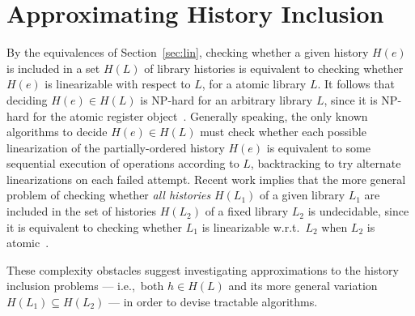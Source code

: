 \section{Approximating History Inclusion}
\label{sec:counting}

By the equivalences of Section~\ref{sec:lin}, checking whether a given history
$H(e)$ is included in a set $H(L)$ of library histories is equivalent to
checking whether $H(e)$ is linearizable with respect to $L$, for a atomic
library $L$. It follows that deciding $H(e) \in H(L)$ is NP-hard for an
arbitrary library $L$, since it is NP-hard for the atomic register
object~\cite{journals/siamcomp/GibbonsK97}.
Generally speaking, the only known algorithms to decide $H(e) \in H(L)$ must
check whether each possible linearization of the partially-ordered history
$H(e)$ is equivalent to some sequential execution of operations according to
$L$, backtracking to try alternate linearizations on each failed attempt.
Recent work implies that the more general problem of checking whether \emph{all
histories} $H(L_1)$ of a given library $L_1$ are included in the set of
histories $H(L_2)$ of a fixed library $L_2$ is undecidable, since it is
equivalent to checking whether $L_1$ is linearizable w.r.t.~$L_2$ when $L_2$ is
atomic~\cite{conf/esop/BouajjaniEEH13}.

These complexity obstacles suggest investigating approximations to the history
inclusion problems --- i.e.,~both $h \in H(L)$ and its more general variation
$H(L_1) \subseteq H(L_2)$ --- in order to devise tractable algorithms.

